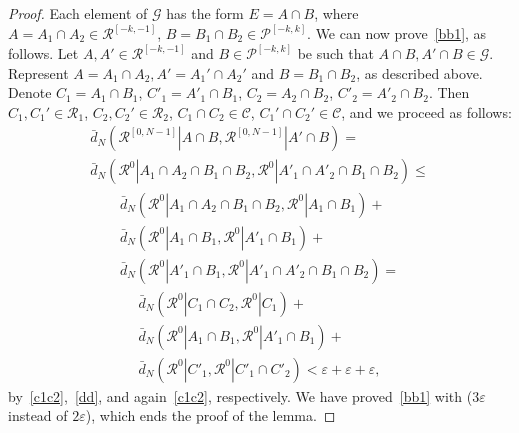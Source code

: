 \documentclass{amsart}
\theoremstyle{remark}
\def \R {\mathcal R}
\def \C {\mathcal C}
\def \G {\mathcal G}
\def \P {\mathcal P}
\def \eps {\varepsilon}
\begin{document}
\begin{proof}
Each element of $\G$ has the form
$E=A\cap B$, where $A=A_1\cap A_2\in\R^{[-k,-1]}$, $B=B_1\cap B_2\in\P^{[-k,k]}$.
We can now prove~\eqref{bb1}, as follows. Let $A,A'\in\R^{[-k,-1]}$ and $B\in\P^{[-k,k]}$ be such that $A\cap B,A'\cap B\in\G$. Represent
$A=A_1\cap A_2,A'=A_1'\cap A_2'$ and $B=B_1\cap B_2$, as described above.
Denote $C_1=A_1\cap B_1$, $C'_1=A'_1\cap B_1$, $C_2=A_2\cap B_2$, $C'_2=A'_2\cap B_2$. Then $C_1,C_1'\in\R_1$, $C_2,C_2'\in\R_2$, $C_1\cap C_2\in\C$, $C_1'\cap C_2'\in\C$, and we proceed as follows:
\begin{multline*}
\bar d_N(\R^{[0,N-1]}|A\cap B, \R^{[0,N-1]}|A'\cap B)=\\  
\bar d_N(\R^0|A_1\cap A_2\cap B_1\cap B_2,\R^0|A'_1\cap A'_2\cap B_1\cap B_2)\le
\end{multline*}
\begin{multline*}
\bar d_N(\R^0|A_1\cap A_2\cap B_1\cap B_2,\R^0|A_1\cap B_1)+\\
\bar d_N(\R^0|A_1\cap B_1,\R^0|A'_1\cap B_1)+\\
\bar d_N(\R^0|A'_1\cap B_1,\R^0|A'_1\cap A'_2\cap B_1\cap B_2)=
\end{multline*}
\begin{multline*}
\bar d_N(\R^0|C_1\cap C_2,\R^0|C_1)+\\
\bar d_N(\R^0|A_1\cap B_1,\R^0|A'_1\cap B_1)+\\
\bar d_N(\R^0|C'_1,\R^0|C'_1\cap C'_2)< \eps+\eps+\eps,
\end{multline*}
by~\eqref{c1c2},~\eqref{dd}, and again~\eqref{c1c2}, respectively.  
We have proved~\eqref{bb1} with ($3\eps$ instead of $2\eps$), which ends the proof of the lemma. 
\end{proof}
\end{document}
